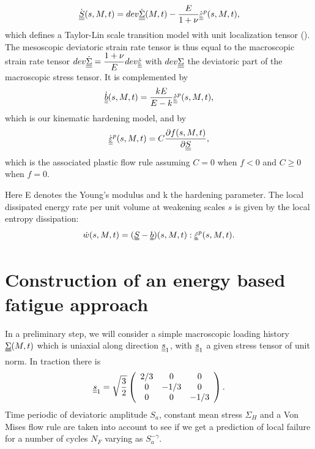 \begin{equation}
\dot{\uline{\uline{S}}}(s,M,t)=dev\dot{\uline{\uline{\Sigma}}}(M,t)-\dfrac{E}{1+\nu}\dot{\uline{\uline{\varepsilon}}}^p(s,M,t), 
\label{eq.mesostress}
\end{equation}
which defines a Taylor-Lin scale transition model with unit localization tensor (\cite{Bosia201239}). The mesoscopic deviatoric strain rate tensor is thus equal to the macroscopic strain rate tensor $dev\dot{\uline{\uline{\Sigma}}}=\dfrac{1+\nu}{E}dev\dot{\uline{\uline{\varepsilon}}}$ with $dev\uline{\uline{\Sigma}}$ the deviatoric part of the macroscopic stress tensor. It is complemented by
\begin{equation}
\dot{\uline{\uline{b}}}(s,M,t)=\dfrac{kE}{E-k} \dot{\uline{\uline{\varepsilon}}}^p(s,M,t), 
\label{eq.backstress}
\end{equation}
which is our kinematic hardening model, and by
\begin{equation}
\dot{\uline{\uline{\varepsilon}}}^p(s,M,t)=C\dfrac{\partial f(s,M,t)}{\partial \uline{\uline{S}}}, 
\label{eq.plasticflow}
\end{equation}
which is the associated plastic flow rule assuming $C=0$ when $f<0$ and  $C\geqslant0$ when $f=0$.

Here E denotes the Young's modulus and k the hardening parameter. The local dissipated energy rate per unit volume at weakening scales $s$  is given by the local entropy dissipation:
\begin{equation}
\dot{w}(s,M,t)=(\uuline{S}-\uuline{b})(s,M,t):\uuline{\dot{\varepsilon}}^p(s,M,t).
\label{dissipated}
\end{equation}

\section{Construction of an energy based fatigue approach}
\label{sec:5.5}
In a preliminary step, we will consider a simple macroscopic loading history $\uuline{\Sigma}(M, t)$ which is uniaxial
 along direction $\uline{\uline{s}}_1$, with $\uline{\uline{s}}_1$ a given stress tensor of unit norm. In traction there is 
 $$\uline{\uline{s}}_1=\sqrt{\dfrac{3}{2}}	\left(
 \begin{array}{ccc}
2/3 & 0 & 0\\
 0 & -1/3 & 0\\ 
 0 & 0 & -1/3\\
 \end{array}\right) . $$
  Time periodic of deviatoric amplitude $S_{a}$, constant mean stress $\Sigma_{H}$ and a Von Mises flow rule are taken into account to see if we get a prediction of local failure for a number of cycles $N_F$ varying as $S_{a}^{-\gamma}.$

